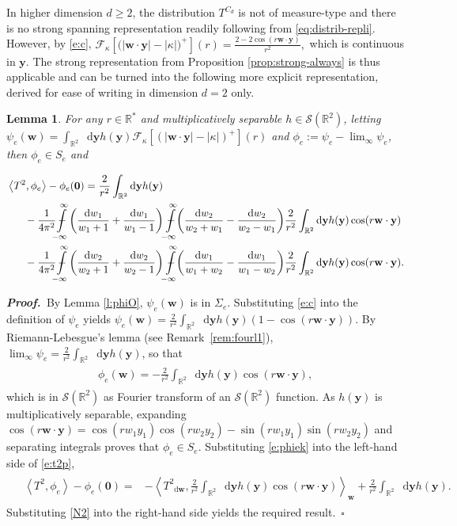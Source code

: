 \documentclass[11pt,A4,twoside]{article}
\numberwithin{equation}{section}
\newcommand{\intcl}{\!\!\Phint{\ \,-}\limits_{-\infty}^\infty\!}
\newcommand{\F}{\mathcal{F}}
\renewcommand*\d{\mathop{}\!\mathrm{d}}
\newcommand{\inner}[1]{\left\langle#1 \right\rangle}
\newcommand{\y}{\mathbf{y}}
\newcommand{\w}{\mathbf{w}}
\newcommand{\R}{\mathbbm{R}}
\renewcommand{\S}{\mathcal{S}}
\def\Phint#1{\mathchoice
  {\XXint\displaystyle\textstyle{#1}}%
  {\XXint\textstyle\scriptstyle{#1}}%
  {\XXint\scriptstyle\scriptscriptstyle{#1}}%
  {\XXint\scriptscriptstyle\scriptscriptstyle{#1}}%
  \!\int}
\def\XXint#1#2#3{{\setbox0=\hbox{$#1{#2#3}{\int}$}
    \vcenter{\hbox{$#2#3$}}\kern-.5\wd0}}
\def\qq{\;\;\;\;\;\;}
\def\bel{\begin{eqnarray*}\begin{aligned}}
\def\eel{\end{aligned}\end{eqnarray*}}
\newcommand{\beqa}{\begin{eqnarray}}
\newcommand{\eeqa}{\end{eqnarray}}
\def\bal{\begin{aligned}}
\def\eal{\end{aligned}}
\def\bll#1{
\beqa\label{#1}\bal
}\def\lel{\eal\eeqa}
\newcommand{\beql}[1]{\bll{#1}}
\newcommand{\eeql}{\lel}
\newtheorem{lemma}[theorem]{Lemma}
\theoremstyle{definition}
\theoremstyle{remark}
\def\R{\mathbb{R}}
\def\phie{\phi_e}
\def\finproof {$\Box$ \vskip 5 pt }\def\finproof{\rule{4pt}{6pt}}\def\finproof{\ensuremath{\square}}
\def\proof{\noindent \emph{\textbf{Proof.} $\, $}}
\begin{document}
In higher dimension $d\ge 2$, the distribution
$T^{C_d}$  is not of measure-type and there is no strong spanning representation readily following from \eqref{eq:distrib-repli}. However, by \eqref{e:c},
$\F_\kappa\left[ \big(|\w \cdot \y | - |\kappa |\big)^+\right](r)      =
     \frac{2-2\cos(r \w\cdot\y)}{r^2} ,$ which is continuous in $\y$. The strong representation from Proposition \ref{prop:strong-always} is thus applicable and 
can be turned into the following more explicit representation, derived for ease of writing in dimension $d=2$ only.
\begin{lemma}\label{l:dc2}
For any $r\in\R^*$ and multiplicatively separable $h\in\S(\R^2)$, letting $\psi_e(\w) = \int_{\R^2} \d\y h(\y) \F_\kappa\left[ (|\w \cdot \y | - |\kappa |)^+\right](r)$ and $\phie :=\psi_e-\lim_{\boldsymbol\infty}\psi_e$, then $\phie \in S_e$ and
    \beql{e:t2p}
    & \inner{T^2, \phie} - \phie(\boldsymbol{0})    =  \frac2{r^2}\int_{\R^2} \d\y h(\y)
    \\
    &\qq - \frac1{4\pi^2}\intcl \left(\frac{\d w_1}{ w_1+1}+\frac{\d w_1}{ w_1-1}\right)\intcl\!\left(\frac{\d w_2}{ w_2+w_1}-\frac{\d w_2}{ w_2-w_1}\right)\!\frac2{r^2}\int_{\R^2} \d\y h(\y) \cos(r \w\cdot\y)
    \\
    &\qq - \frac1{4\pi^2} \intcl \left(\frac{\d w_2}{ w_2+1}+\frac{\d w_2}{ w_2-1}\right)\intcl\!\left(\frac{\d w_1}{ w_1+w_2}-\frac{\d w_1}{ w_1-w_2}\right)\!\frac2{r^2} \int_{\R^2} \d\y h(\y) \cos(r \w\cdot\y).%
\eeql
\end{lemma}
\proof  By Lemma \ref{l:phiO}, $\psi_e(\w) $ is in $\Sigma_e.$ Substituting \eqref{e:c} into the definition of $\psi_e $ yields $\psi_e(\w) = \frac2{r^2}\int_{\R^2} \d\y h(\y) (1-\cos(r \w\cdot\y)) $. By Riemann-Lebesgue's lemma (see Remark~\ref{rem:fourl1}), $\lim_{\pmb{\infty}}\psi_e = \frac2{r^2} \int_{\R^2} \d\y h(\y)$, so that \beql{e:phiek}\phie(\w) = -\frac{2}{r^2}\int_{\R^2} \d\y h(\y) \cos(r \w\cdot\y) ,\eeql 
which is in $\S(\R^2)$ as Fourier transform of an $\S(\R^2)$ function.  As $h(\y)
$ is multiplicatively separable, expanding $\cos(r \w\cdot\y) = \cos(rw_1y_1)\cos(rw_2y_2) - \sin(rw_1y_1)\sin(rw_2y_2)$ and separating integrals 
proves that $\phie \in S_e$.  Substituting \eqref{e:phiek} into the left-hand side of \eqref{e:t2p},
\bel
    &   \inner{T^2, \phie} - \phie(\boldsymbol{0}) 
    =& -\inner{T_{\d \w}^2, \frac{2}{r^2}\int_{\R^2} \d\y h(\y) \cos(r \w\cdot\y)}_{\w}+ \frac2{r^2}\int_{\R^2} \d\y h(\y).
\eel
Substituting \eqref{N2} into the right-hand side yields the required result.\ \finproof 
\end{document}
